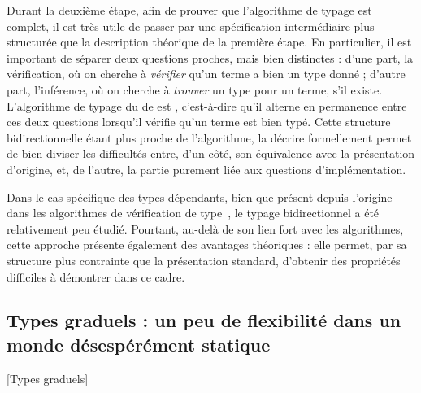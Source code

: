 Durant la deuxième étape, afin de prouver que l’algorithme de typage est complet,
il est très utile de
passer par une spécification intermédiaire plus structurée que la description
théorique de la première étape.
En particulier, il est important de séparer deux questions proches, mais
bien distinctes :
d’une part, la vérification, où on cherche à \emph{vérifier}
qu’un terme a bien un type donné ;
d’autre part, l’inférence, où on cherche à \emph{trouver}
un type pour un terme, s’il existe.
L’algorithme de typage du  de  est ,
c’est-à-dire qu’il alterne en permanence entre ces deux questions
lorsqu’il vérifie qu’un terme est bien typé.
Cette structure bidirectionnelle étant plus proche de l’algorithme,
la décrire formellement permet de bien diviser les difficultés entre, d’un côté,
son équivalence avec la présentation
d’origine, et, de l’autre, la partie purement liée aux questions d’implémentation.

Dans le cas spécifique des types dépendants, bien que présent depuis l’origine dans les algorithmes de vérification de type~,
le typage bidirectionnel a été relativement peu étudié.
Pourtant, au-delà de son lien fort avec les algorithmes,
cette approche présente également des avantages théoriques : elle permet,
par sa structure plus contrainte que la présentation standard,
d’obtenir des propriétés difficiles à démontrer dans ce cadre.

\subsection{Types graduels : un peu de flexibilité dans un monde désespérément statique}
  [Types graduels]
\label{sec:intro-graduel}

